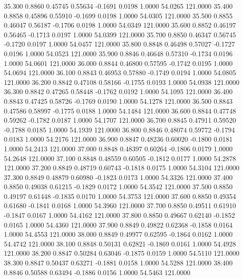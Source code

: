   35.300   0.8860   0.45745   0.55634  -0.1691   0.0198   1.0000  54.0265 121.0000
  35.400   0.8858   0.45896   0.55910  -0.1699   0.0198   1.0000  54.0305 121.0000
  35.500   0.8855   0.46047   0.56187  -0.1706   0.0198   1.0000  54.0349 121.0000
  35.600   0.8852   0.46197   0.56465  -0.1713   0.0197   1.0000  54.0399 121.0000
  35.700   0.8850   0.46347   0.56745  -0.1720   0.0197   1.0000  54.0457 121.0000
  35.800   0.8848   0.46498   0.57027  -0.1727   0.0196   1.0000  54.0523 121.0000
  35.900   0.8846   0.46648   0.57310  -0.1734   0.0196   1.0000  54.0601 121.0000
  36.000   0.8844   0.46800   0.57595  -0.1742   0.0195   1.0000  54.0694 121.0000
  36.100   0.8843   0.46953   0.57880  -0.1749   0.0194   1.0000  54.0805 121.0000
  36.200   0.8842   0.47108   0.58166  -0.1755   0.0193   1.0000  54.0938 121.0000
  36.300   0.8842   0.47265   0.58448  -0.1762   0.0192   1.0000  54.1095 121.0000
  36.400   0.8843   0.47425   0.58726  -0.1769   0.0190   1.0000  54.1278 121.0000
  36.500   0.8843   0.47586   0.58997  -0.1775   0.0188   1.0000  54.1484 121.0000
  36.600   0.8844   0.47748   0.59262  -0.1782   0.0187   1.0000  54.1707 121.0000
  36.700   0.8845   0.47911   0.59520  -0.1788   0.0185   1.0000  54.1939 121.0000
  36.800   0.8846   0.48074   0.59772  -0.1794   0.0183   1.0000  54.2176 121.0000
  36.900   0.8847   0.48236   0.60020  -0.1800   0.0181   1.0000  54.2413 121.0000
  37.000   0.8848   0.48397   0.60264  -0.1806   0.0179   1.0000  54.2648 121.0000
  37.100   0.8848   0.48559   0.60505  -0.1812   0.0177   1.0000  54.2878 121.0000
  37.200   0.8849   0.48719   0.60743  -0.1818   0.0175   1.0000  54.3104 121.0000
  37.300   0.8849   0.48879   0.60980  -0.1823   0.0173   1.0000  54.3326 121.0000
  37.400   0.8850   0.49038   0.61215  -0.1829   0.0172   1.0000  54.3542 121.0000
  37.500   0.8850   0.49197   0.61448  -0.1835   0.0170   1.0000  54.3753 121.0000
  37.600   0.8850   0.49354   0.61680  -0.1841   0.0168   1.0000  54.3960 121.0000
  37.700   0.8850   0.49511   0.61910  -0.1847   0.0167   1.0000  54.4162 121.0000
  37.800   0.8850   0.49667   0.62140  -0.1852   0.0165   1.0000  54.4360 121.0000
  37.900   0.8849   0.49822   0.62368  -0.1858   0.0164   1.0000  54.4553 121.0000
  38.000   0.8849   0.49977   0.62595  -0.1864   0.0162   1.0000  54.4742 121.0000
  38.100   0.8848   0.50131   0.62821  -0.1869   0.0161   1.0000  54.4928 121.0000
  38.200   0.8847   0.50284   0.63046  -0.1875   0.0159   1.0000  54.5110 121.0000
  38.300   0.8847   0.50437   0.63271  -0.1881   0.0158   1.0000  54.5288 121.0000
  38.400   0.8846   0.50588   0.63494  -0.1886   0.0156   1.0000  54.5463 121.0000

